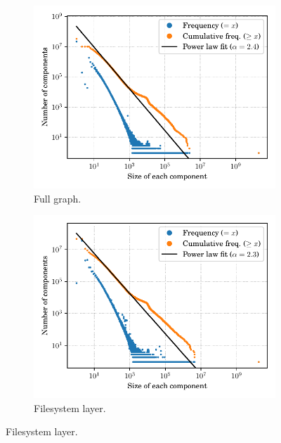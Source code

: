 \begin{figure}
    \centering
    \begin{subfigure}{.49\textwidth}
        \includegraphics[width=\linewidth]{img/topology/connectedcomponents/full}
        \caption{Full graph.}
        \label{fig:connectedcomponents_full}
    \end{subfigure}\hfill
    \begin{subfigure}{.49\textwidth}
        \includegraphics[width=\linewidth]{img/topology/connectedcomponents/dir+cnt}
        \caption{Filesystem layer.}
        \label{fig:connectedcomponents_dir+cnt}
    \end{subfigure}
    \newline

\end{figure}
